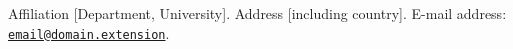 Affiliation [Department, University]. Address [including country]. E-mail address: \href{mailto:email@domain.extension}{\texttt{email@domain.extension}}.